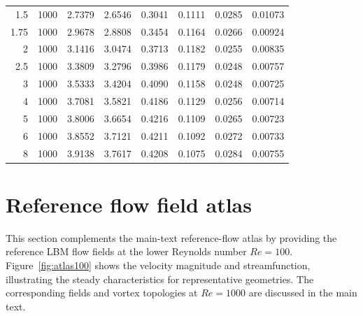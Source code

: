 \documentclass[11pt]{article}
\begin{document}
\begin{table}[H]
\begin{tabular}{@{}rrrrrrrr@{}}
  1.5 & 1000 &  2.7379 &  2.6546 &  0.3041 &  0.1111 &  0.0285 &  0.01073 \\
 1.75 & 1000 &  2.9678 &  2.8808 &  0.3454 &  0.1164 &  0.0266 &  0.00924 \\
    2 & 1000 &  3.1416 &  3.0474 &  0.3713 &  0.1182 &  0.0255 &  0.00835 \\
  2.5 & 1000 &  3.3809 &  3.2796 &  0.3986 &  0.1179 &  0.0248 &  0.00757 \\
    3 & 1000 &  3.5333 &  3.4204 &  0.4090 &  0.1158 &  0.0248 &  0.00725 \\
    4 & 1000 &  3.7081 &  3.5821 &  0.4186 &  0.1129 &  0.0256 &  0.00714 \\
    5 & 1000 &  3.8006 &  3.6654 &  0.4216 &  0.1109 &  0.0265 &  0.00723 \\
    6 & 1000 &  3.8552 &  3.7121 &  0.4211 &  0.1092 &  0.0272 &  0.00733 \\
    8 & 1000 &  3.9138 &  3.7617 &  0.4208 &  0.1075 &  0.0284 &  0.00755 \\
\bottomrule
\end{tabular}
\end{table}
\par


\section{Reference flow field atlas}\label{sec:atlas}
This section complements the main-text reference-flow atlas by providing the reference LBM flow fields at the lower Reynolds number $Re=100$. Figure~\ref{fig:atlas100} shows the velocity magnitude and streamfunction, illustrating the steady characteristics for representative geometries. The corresponding fields and vortex topologies at $Re=1000$ are discussed in the main text.
\end{document}
